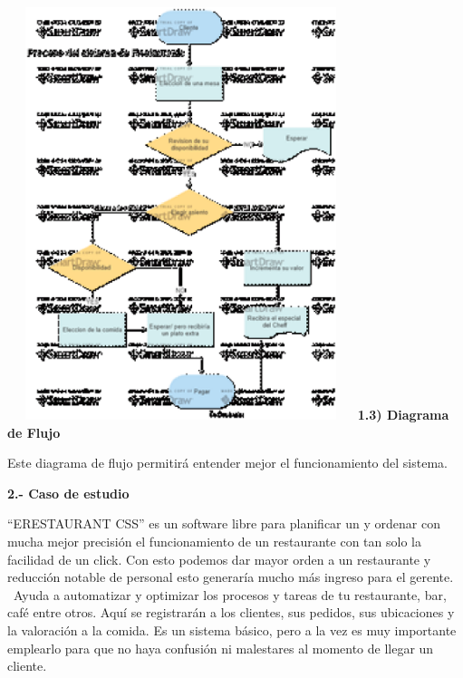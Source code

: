\documentclass{article} %
\begin{document}
\noindent \includegraphics*[width=3.98in, height=4.74in, keepaspectratio=false]{image3}\textbf{ 1.3) Diagrama de Flujo }

\noindent Este diagrama de flujo permitir\'{a} entender mejor el funcionamiento del sistema. 

\noindent 

\noindent 

\noindent 

\noindent 

\noindent 

\noindent 

\noindent 

\noindent 

\noindent 

\noindent 

\noindent 

\noindent 

\noindent 

\noindent 

\noindent 

\noindent 

\noindent 

\noindent 

\noindent \textbf{2.- Caso de estudio}

\noindent      ``ERESTAURANT CSS'' es un software libre para planificar un y ordenar con mucha mejor precisi\'{o}n el funcionamiento de un restaurante con tan solo la facilidad de un click. Con esto podemos dar mayor orden a un restaurante y reducci\'{o}n notable de personal esto generar\'{i}a mucho m\'{a}s ingreso para el gerente. ~Ayuda a automatizar y optimizar los procesos y tareas de tu restaurante, bar, caf\'{e} entre otros. Aqu\'{i} se registrar\'{a}n a los clientes, sus pedidos, sus ubicaciones y la valoraci\'{o}n a la comida. Es un sistema b\'{a}sico, pero a la vez es muy importante emplearlo para que no haya confusi\'{o}n ni malestares al momento de llegar un cliente. 

\noindent 
\end{document}
